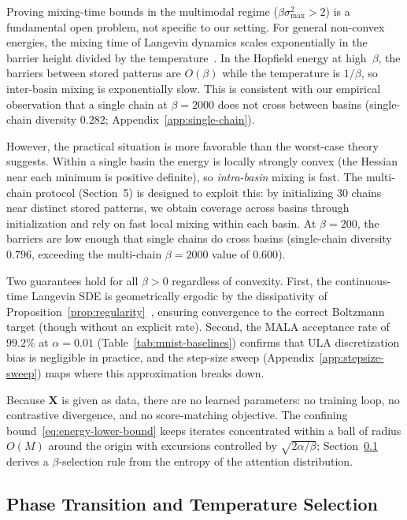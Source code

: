 Proving mixing-time bounds in the multimodal regime ($\beta\sigma_{\max}^{2}>2$) is a fundamental open problem, not specific to our setting. For general non-convex energies, the mixing time of Langevin dynamics scales exponentially in the barrier height divided by the temperature~\cite{bovier2004metastability}. In the Hopfield energy at high~$\beta$, the barriers between stored patterns are $O(\beta)$ while the temperature is $1/\beta$, so inter-basin mixing is exponentially slow. This is consistent with our empirical observation that a single chain at $\beta{=}2000$ does not cross between basins (single-chain diversity $0.282$; Appendix~\ref{app:single-chain}).

However, the practical situation is more favorable than the worst-case theory suggests. Within a single basin the energy is locally strongly convex (the Hessian near each minimum is positive definite), so \emph{intra-basin} mixing is fast. The multi-chain protocol (Section~5) is designed to exploit this: by initializing 30 chains near distinct stored patterns, we obtain coverage across basins through initialization and rely on fast local mixing within each basin. At $\beta{=}200$, the barriers are low enough that single chains do cross basins (single-chain diversity $0.796$, exceeding the multi-chain $\beta{=}2000$ value of $0.600$).

Two guarantees hold for all $\beta>0$ regardless of convexity. First, the continuous-time Langevin SDE is geometrically ergodic by the dissipativity of Proposition~\ref{prop:regularity}~\cite{robertsTweedieExponentialConvergence1996}, ensuring convergence to the correct Boltzmann target (though without an explicit rate). Second, the MALA acceptance rate of $99.2\%$ at $\alpha{=}0.01$ (Table~\ref{tab:mnist-baselines}) confirms that ULA discretization bias is negligible in practice, and the step-size sweep (Appendix~\ref{app:stepsize-sweep}) maps where this approximation breaks down.

Because $\mathbf{X}$ is given as data, there are no learned parameters: no training loop, no contrastive divergence, and no score-matching objective. The confining bound~\eqref{eq:energy-lower-bound} keeps iterates concentrated within a ball of radius $O(M)$ around the origin with excursions controlled by $\sqrt{2\alpha/\beta}$; Section~\ref{sec:phase-transition} derives a $\beta$-selection rule from the entropy of the attention distribution.

\subsection{Phase Transition and Temperature Selection}\label{sec:phase-transition}

